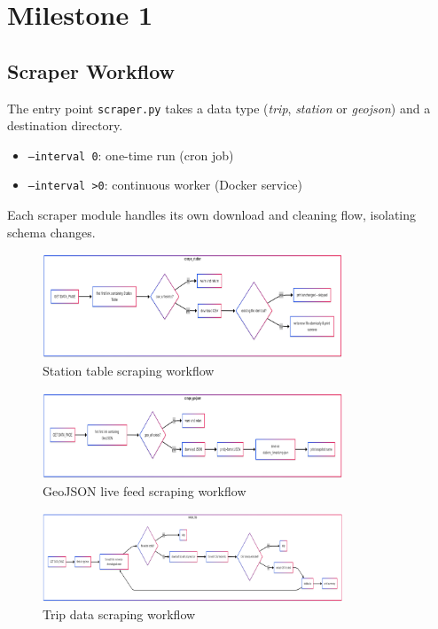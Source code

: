 \documentclass{article}
\begin{document}
\section{Milestone 1}

\subsection{Scraper Workflow}
The entry point \texttt{scraper.py} takes a data type (\textit{trip}, \textit{station} or \textit{geojson}) and a destination directory.
\begin{itemize}
    \item \texttt{--interval 0}: one-time run (cron job)
    \item \texttt{--interval >0}: continuous worker (Docker service)
\end{itemize}
Each scraper module handles its own download and cleaning flow, isolating schema changes.

\begin{figure}[H]
    \centering
\includegraphics[width=0.8\textwidth]{stionScraper.png}
    \caption{Station table scraping workflow}
    \label{fig:flowchart_station}
\end{figure}

\begin{figure}[H]
    \centering
   \includegraphics[width=0.8\textwidth]{geojsonScraper.png}
    \caption{GeoJSON live feed scraping workflow}
    \label{fig:flowchart_geojson}
\end{figure}

\begin{figure}[H]
    \centering
\includegraphics[width=0.8\textwidth]{tripScraping.png}
    \caption{Trip data scraping workflow}
    \label{fig:flowchart_trip}
\end{figure}
\end{document}
